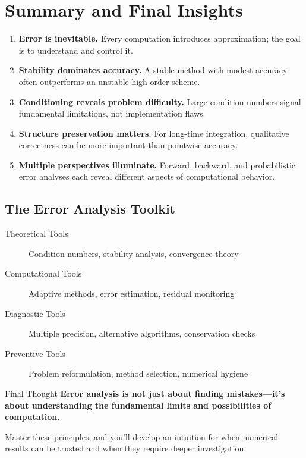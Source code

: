 \section{Summary and Final Insights}
\label{sec:final-summary}

\begin{remark}[title=Fundamental Principles]{}{}
    \begin{enumerate}
        \item \textbf{Error is inevitable.} Every computation introduces approximation; the goal is to understand and control it.

        \item \textbf{Stability dominates accuracy.} A stable method with modest accuracy often outperforms an unstable high-order scheme.

        \item \textbf{Conditioning reveals problem difficulty.} Large condition numbers signal fundamental limitations, not implementation flaws.

        \item \textbf{Structure preservation matters.} For long-time integration, qualitative correctness can be more important than pointwise accuracy.

        \item \textbf{Multiple perspectives illuminate.} Forward, backward, and probabilistic error analyses each reveal different aspects of computational behavior.
    \end{enumerate}
\end{remark}

\subsection{The Error Analysis Toolkit}
\label{subsec:toolkit}

\begin{description}
    \item[Theoretical Tools] Condition numbers, stability analysis, convergence theory
    \item[Computational Tools] Adaptive methods, error estimation, residual monitoring
    \item[Diagnostic Tools] Multiple precision, alternative algorithms, conservation checks
    \item[Preventive Tools] Problem reformulation, method selection, numerical hygiene
\end{description}


\begin{remark}{Final Thought}{}
    \textbf{Error analysis is not just about finding mistakes—it's about understanding the fundamental limits and possibilities of computation.}

    Master these principles, and you'll develop an intuition for when numerical results can be trusted and when they require deeper investigation.
\end{remark}
